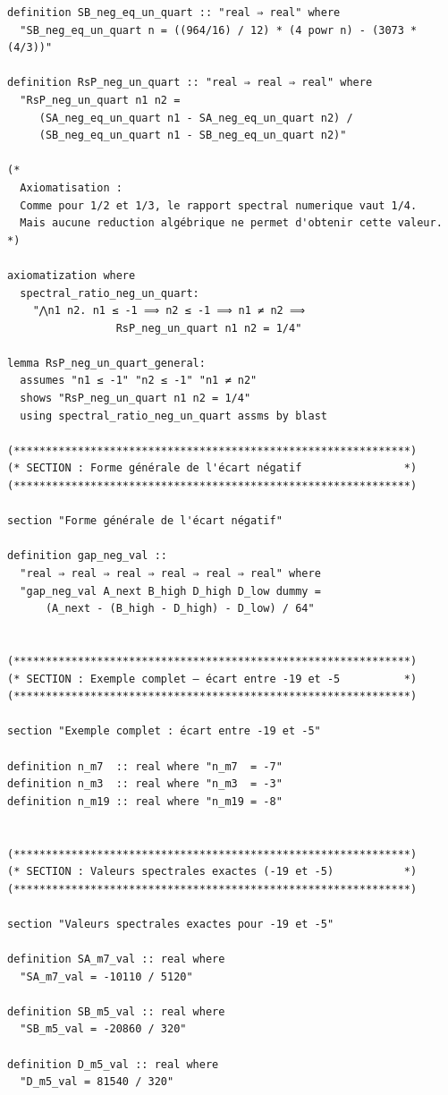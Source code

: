\documentclass[a4paper,11pt]{article}
\begin{document}
\begin{holcode}[title={\textcolor{white}{File: methode\_spectral.thy -- Part 1/4}}]
\begin{lstlisting}
definition SB_neg_eq_un_quart :: "real ⇒ real" where
  "SB_neg_eq_un_quart n = ((964/16) / 12) * (4 powr n) - (3073 * (4/3))"

definition RsP_neg_un_quart :: "real ⇒ real ⇒ real" where
  "RsP_neg_un_quart n1 n2 =
     (SA_neg_eq_un_quart n1 - SA_neg_eq_un_quart n2) /
     (SB_neg_eq_un_quart n1 - SB_neg_eq_un_quart n2)"

(*
  Axiomatisation :
  Comme pour 1/2 et 1/3, le rapport spectral numerique vaut 1/4.
  Mais aucune reduction algébrique ne permet d'obtenir cette valeur.
*)

axiomatization where
  spectral_ratio_neg_un_quart:
    "⋀n1 n2. n1 ≤ -1 ⟹ n2 ≤ -1 ⟹ n1 ≠ n2 ⟹
                 RsP_neg_un_quart n1 n2 = 1/4"

lemma RsP_neg_un_quart_general:
  assumes "n1 ≤ -1" "n2 ≤ -1" "n1 ≠ n2"
  shows "RsP_neg_un_quart n1 n2 = 1/4"
  using spectral_ratio_neg_un_quart assms by blast

(**************************************************************)
(* SECTION : Forme générale de l'écart négatif                *)
(**************************************************************)

section "Forme générale de l'écart négatif"

definition gap_neg_val ::
  "real ⇒ real ⇒ real ⇒ real ⇒ real ⇒ real" where
  "gap_neg_val A_next B_high D_high D_low dummy =
      (A_next - (B_high - D_high) - D_low) / 64"


(**************************************************************)
(* SECTION : Exemple complet – écart entre -19 et -5          *)
(**************************************************************)

section "Exemple complet : écart entre -19 et -5"

definition n_m7  :: real where "n_m7  = -7"
definition n_m3  :: real where "n_m3  = -3"
definition n_m19 :: real where "n_m19 = -8"


(**************************************************************)
(* SECTION : Valeurs spectrales exactes (-19 et -5)           *)
(**************************************************************)

section "Valeurs spectrales exactes pour -19 et -5"

definition SA_m7_val :: real where
  "SA_m7_val = -10110 / 5120"

definition SB_m5_val :: real where
  "SB_m5_val = -20860 / 320"

definition D_m5_val :: real where
  "D_m5_val = 81540 / 320"


\end{lstlisting}
\end{holcode}
\end{document}
